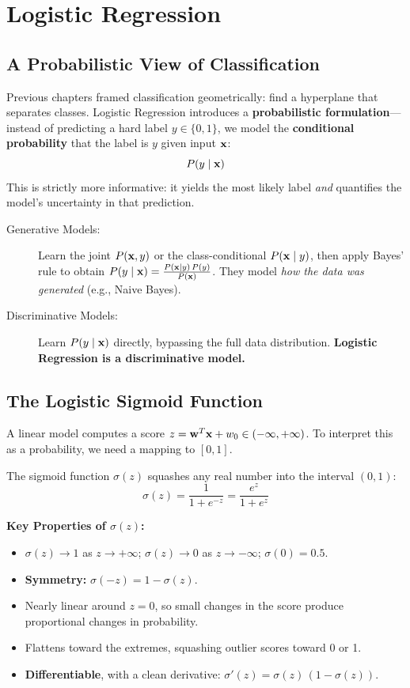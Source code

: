 \chapter*{Logistic Regression}

\section*{A Probabilistic View of Classification}

Previous chapters framed classification geometrically: find a hyperplane that separates classes. Logistic Regression introduces a \textbf{probabilistic formulation}---instead of predicting a hard label $y \in \{0,1\}$, we model the \textbf{conditional probability} that the label is $y$ given input $\mathbf{x}$:
$$P(y \mid \mathbf{x})$$
This is strictly more informative: it yields the most likely label \textit{and} quantifies the model's uncertainty in that prediction.

\begin{description}
    \item[Generative Models:] Learn the joint $P(\mathbf{x}, y)$ or the class-conditional $P(\mathbf{x} \mid y)$, then apply Bayes' rule to obtain $P(y \mid \mathbf{x}) = \frac{P(\mathbf{x} \mid y)\,P(y)}{P(\mathbf{x})}$. They model \textit{how the data was generated} (e.g., Naive Bayes).
    \item[Discriminative Models:] Learn $P(y \mid \mathbf{x})$ directly, bypassing the full data distribution. \textbf{Logistic Regression is a discriminative model.}
\end{description}

\section*{The Logistic Sigmoid Function}

A linear model computes a score $z = \mathbf{w}^T\mathbf{x} + w_0 \in (-\infty, +\infty)$. To interpret this as a probability, we need a mapping to $[0,1]$.

\begin{definition}
The sigmoid function $\sigma(z)$ squashes any real number into the interval $(0,1)$:
$$\sigma(z) = \frac{1}{1 + e^{-z}} = \frac{e^z}{1 + e^z}$$
\end{definition}

\textbf{Key Properties of $\sigma(z)$:}
\begin{itemize}
    \item $\sigma(z) \to 1$ as $z \to +\infty$; \quad $\sigma(z) \to 0$ as $z \to -\infty$; \quad $\sigma(0) = 0.5$.
    \item \textbf{Symmetry:} $\sigma(-z) = 1 - \sigma(z)$.
    \item Nearly linear around $z=0$, so small changes in the score produce proportional changes in probability.
    \item Flattens toward the extremes, squashing outlier scores toward 0 or 1.
    \item \textbf{Differentiable}, with a clean derivative: $\sigma'(z) = \sigma(z)\,(1 - \sigma(z))$.
\end{itemize}

